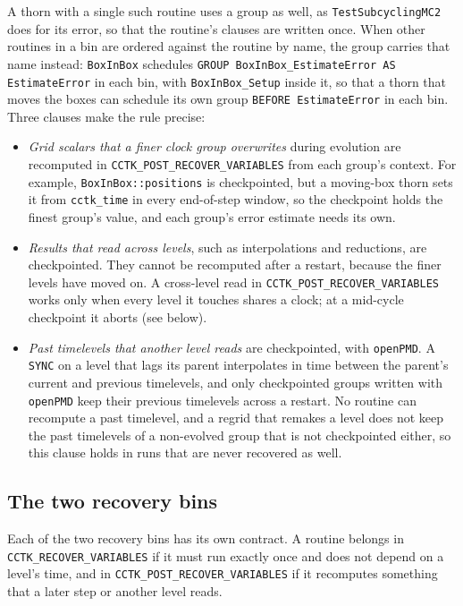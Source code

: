 %
A thorn with a single such routine uses a group as well, as \texttt{TestSubcyclingMC2} does for its error, so that the routine's clauses are written once. When other routines in a bin are ordered against the routine by name, the group carries that name instead: \texttt{BoxInBox} schedules \texttt{GROUP BoxInBox\_EstimateError AS EstimateError} in each bin, with \texttt{BoxInBox\_Setup} inside it, so that a thorn that moves the boxes can schedule its own group \texttt{BEFORE EstimateError} in each bin.
%
Three clauses make the rule precise:
%
\begin{itemize}
\item \emph{Grid scalars that a finer clock group overwrites} during evolution are recomputed in \texttt{CCTK\_POST\_RECOVER\_VARIABLES} from each group's context. For example, \texttt{BoxInBox::positions} is checkpointed, but a moving-box thorn sets it from \texttt{cctk\_time} in every end-of-step window, so the checkpoint holds the finest group's value, and each group's error estimate needs its own.
\item \emph{Results that read across levels}, such as interpolations and reductions, are checkpointed. They cannot be recomputed after a restart, because the finer levels have moved on. A cross-level read in \texttt{CCTK\_POST\_RECOVER\_VARIABLES} works only when every level it touches shares a clock; at a mid-cycle checkpoint it aborts (see below).
\item \emph{Past timelevels that another level reads} are checkpointed, with \texttt{openPMD}. A \texttt{SYNC} on a level that lags its parent interpolates in time between the parent's current and previous timelevels, and only checkpointed groups written with \texttt{openPMD} keep their previous timelevels across a restart. No routine can recompute a past timelevel, and a regrid that remakes a level does not keep the past timelevels of a non-evolved group that is not checkpointed either, so this clause holds in runs that are never recovered as well.
\end{itemize}

\subsection{The two recovery bins}

Each of the two recovery bins has its own contract. A routine belongs in \texttt{CCTK\_RECOVER\_VARIABLES} if it must run exactly once and does not depend on a level's time, and in \texttt{CCTK\_POST\_RECOVER\_VARIABLES} if it recomputes something that a later step or another level reads.

